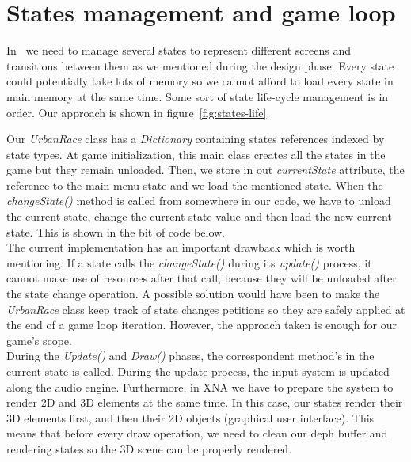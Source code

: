 

\section{States management and game loop}

In \game\ we need to manage several states to represent different screens and transitions
between them as we mentioned during the design phase. Every state could potentially take
lots of memory so we cannot afford to load every state in main memory at the same time.
Some sort of state life-cycle management is in order. Our approach is shown in figure~\ref{fig:states-life}.


Our \textit{UrbanRace} class has a \textit{Dictionary} containing states references
indexed by state types. At game initialization, this main class creates all the states in
the game but they remain unloaded. Then, we store in out \textit{currentState} attribute,
the reference to the main menu state and we load the mentioned state. When the \textit{changeState()}
method is called from somewhere in our code, we have to unload the current state, change the
current state value and then load the new current state. This is shown in the bit of code below.\\



The current implementation has an important drawback which is worth mentioning. If a state
calls the \textit{changeState()} during its \textit{update()} process, it cannot make use
of resources after that call, because they will be unloaded after the state change operation.
A possible solution would have been to make the \textit{UrbanRace} class keep track of
state changes petitions so they are safely applied at the end of a game loop iteration. However,
the approach taken is enough for our game's scope.\\

During the \textit{Update()} and \textit{Draw()} phases, the correspondent method's in the
current state is called. During the update process, the input system is
updated along the audio engine. Furthermore, in XNA we have to prepare the system to render 2D
and 3D elements at the same time. In this case, our states render their 3D elements first, 
and then their 2D objects (graphical user interface). This means that before every draw
operation, we need to clean our deph buffer and rendering states so the 3D scene can be
properly rendered.

